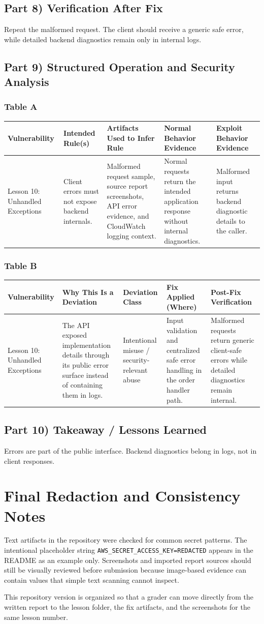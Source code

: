 \documentclass[12pt]{article}
\makeatletter
\newcommand{\analysistables}[9]{
\subsubsection*{Table A}
{\footnotesize
\begin{longtable}{@{}p{0.13\textwidth}p{0.18\textwidth}p{0.17\textwidth}p{0.16\textwidth}p{0.16\textwidth}@{}}
\toprule
Vulnerability & Intended Rule(s) & Artifacts Used to Infer Rule & Normal Behavior Evidence & Exploit Behavior Evidence \\
\midrule
#1 & #2 & #3 & #4 & #5 \\
\bottomrule
\end{longtable}
}

\subsubsection*{Table B}
{\footnotesize
\begin{longtable}{@{}p{0.13\textwidth}p{0.18\textwidth}p{0.13\textwidth}p{0.18\textwidth}p{0.16\textwidth}@{}}
\toprule
Vulnerability & Why This Is a Deviation & Deviation Class & Fix Applied (Where) & Post-Fix Verification \\
\midrule
#1 & #6 & #7 & #8 & #9 \\
\bottomrule
\end{longtable}
}
}
\makeatother
\begin{document}
\subsection*{Part 8) Verification After Fix}
Repeat the malformed request. The client should receive a generic safe error, while detailed backend diagnostics remain only in internal logs.

\subsection*{Part 9) Structured Operation and Security Analysis}
\analysistables
{Lesson 10: Unhandled Exceptions}
{Client errors must not expose backend internals.}
{Malformed request sample, source report screenshots, API error evidence, and CloudWatch logging context.}
{Normal requests return the intended application response without internal diagnostics.}
{Malformed input returns backend diagnostic details to the caller.}
{The API exposed implementation details through its public error surface instead of containing them in logs.}
{Intentional misuse / security-relevant abuse}
{Input validation and centralized safe error handling in the order handler path.}
{Malformed requests return generic client-safe errors while detailed diagnostics remain internal.}

\subsection*{Part 10) Takeaway / Lessons Learned}
Errors are part of the public interface. Backend diagnostics belong in logs, not in client responses.

\clearpage
\section*{Final Redaction and Consistency Notes}

Text artifacts in the repository were checked for common secret patterns. The intentional placeholder string \texttt{AWS\_SECRET\_ACCESS\_KEY=REDACTED} appears in the README as an example only. Screenshots and imported report sources should still be visually reviewed before submission because image-based evidence can contain values that simple text scanning cannot inspect.

This repository version is organized so that a grader can move directly from the written report to the lesson folder, the fix artifacts, and the screenshots for the same lesson number.
\end{document}
